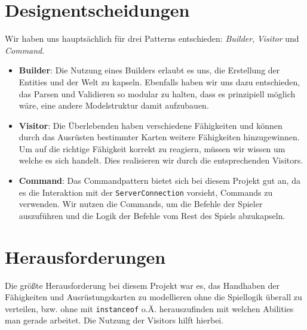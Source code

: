 \documentclass[10pt,a4paper]{article}
\begin{document}
\section*{Designentscheidungen}
\noindent Wir haben uns hauptsächlich für drei Patterns entschieden: \emph{Builder}, \emph{Visitor} und \emph{Command}.
\begin{itemize}
    \item \textbf{Builder}: Die Nutzung eines Builders erlaubt es uns, die Erstellung der Entities und der Welt zu kapseln.
                            Ebenfalls haben wir uns dazu entschieden, das Parsen und Validieren so modular zu halten, dass
                            es prinzipiell möglich wäre, eine andere Modelstruktur damit aufzubauen.
    \item \textbf{Visitor}: Die Überlebenden haben verschiedene Fähigkeiten und können durch das Ausrüsten bestimmter Karten weitere
                            Fähigkeiten hinzugewinnen. Um auf die richtige Fähigkeit korrekt zu reagiern, müssen wir wissen um welche
                            es sich handelt. Dies realisieren wir durch die entsprechenden Visitors.
    \item \textbf{Command}: Das Commandpattern bietet sich bei diesem Projekt gut an, da es die Interaktion mit der \texttt{ServerConnection}
                            vorsieht, Commands zu verwenden. Wir nutzen die Commands, um die Befehle der Spieler auszuführen und die
                            Logik der Befehle vom Rest des Spiels abzukapseln.
\end{itemize}

\section*{Herausforderungen}
\noindent Die größte Herausforderung bei diesem Projekt war es, das Handhaben der Fähigkeiten und Ausrüstungskarten zu modellieren ohne die Spiellogik überall zu
verteilen, bzw. ohne mit \texttt{instanceof} o.Ä. herauszufinden mit welchen Abilities man gerade arbeitet. Die Nutzung der Visitors hilft hierbei.
\end{document}
